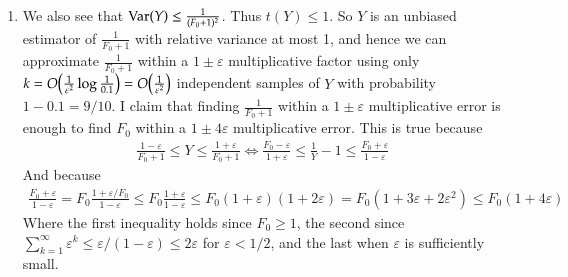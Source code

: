 \documentclass[12pt]{article}
\theoremstyle{definitionstyle}
\def \ve{\varepsilon}
\newcommand{\Var}{\mathrm{Var}\qty}
\begin{document}
\begin{enumerate}[leftmargin=\labelsep]
\begin{enumerate}
			\item We also see that $\Var(Y) \leq \frac{1}{(F_0+1)^2}$. Thus $t(Y) \leq 1$. So $Y$ is an unbiased estimator of $\frac{1}{F_0+1}$ with relative variance at most 1, and hence we can approximate $\frac{1}{F_0+1}$ within a $1 \pm \ve$ multiplicative factor using only $k = O\qty(\frac{1}{\ve^2}\log \frac1{0.1})=O\qty(\frac{1}{\ve^2})$ independent samples of $Y$ with probability $1-0.1 = 9/10$. I claim that finding $\frac{1}{F_0+1}$ within a $1 \pm \ve$ multiplicative error is enough to find $F_0$ within a $1\pm 4\ve$ multiplicative error. This is true because
			\begin{align*}
				\frac{1-\ve}{F_0+1} \leq Y \leq \frac{1+\ve}{F_0+1} \iff \frac{F_0-\ve}{1+\ve} \leq \frac{1}{Y} - 1 \leq \frac{F_0+\ve}{1-\ve}
			\end{align*}
			And because 
			\begin{align*}
				\frac{F_0+\ve}{1-\ve} = F_0 \frac{1+\ve/F_0}{1-\ve} \leq F_0\frac{1+\ve}{1-\ve} \leq F_0(1+\ve)(1+2\ve) = F_0(1+3\ve+2\ve^2) \leq F_0(1+4\ve)
			\end{align*}
			Where the first inequality holds since $F_0 \geq 1$, the second since $\sum_{k=1}^\infty \ve^k \leq \ve/(1-\ve) \leq 2\ve$ for $\ve < 1/2$, and the last when $\ve$ is sufficiently small.
		\end{enumerate}
	\end{enumerate}
\end{document}
